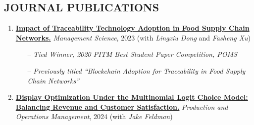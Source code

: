 \documentclass[margin]{res} %
\begin{document}
\begin{resume}
\section{JOURNAL PUBLICATIONS}
\begin{enumerate}[leftmargin=*]
    \item %
        \href{https://pubsonline.informs.org/doi/abs/10.1287/mnsc.2022.4440?casa_token=br5-nMm53OIAAAAA:nQxcEPswA7DUJZgJ1CZsL0DModEzd-a-1Y5zOh68ebSQo1LU177cocuRpaC3BXYQcoELLTilwzPY}{\textbf{Impact of Traceability Technology Adoption in Food Supply Chain Networks.}} {\it Management Science}, 2023 (with {\it Lingxiu Dong} and {\it Fasheng Xu})
        \begin{itemize}
            \item[--] {\it Tied Winner, 2020 PITM Best Student Paper Competition, POMS}
            \item[--] {\it Previously titled ``Blockchain Adoption for Traceability in Food Supply Chain Networks''}
        \end{itemize}
    \item \href{https://papers.ssrn.com/sol3/papers.cfm?abstract_id=3909033}{\textbf{Display Optimization Under the Multinomial Logit Choice Model: Balancing Revenue and Customer Satisfaction.}} {\it Production and Operations Management}, 2024 (with {\it Jake Feldman})
\end{enumerate}



\end{resume}
\end{document}
